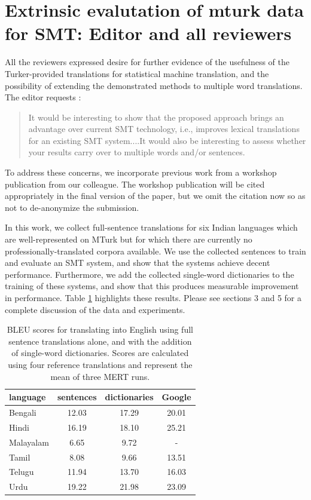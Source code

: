 \documentclass[11pt]{article}
\begin{document}
\section{Extrinsic evalutation of mturk data for SMT: Editor and all reviewers}

All the reviewers expressed desire for further evidence of the usefulness of the Turker-provided translations for statistical machine translation, and the possibility of extending the demonstrated methods to multiple word translations. The editor requests :

\begin{quote}
It would be interesting to show that the proposed approach brings an advantage over current SMT technology, i.e., improves lexical translations for an existing SMT system....It would also be interesting to assess whether your results carry over to multiple words and/or sentences. 
\end{quote}

To address these concerns, we incorporate previous work from a workshop publication from our colleague. The workshop publication will be cited appropriately in the final version of the paper, but we omit the citation now so as not to de-anonymize the submission. 

In this work, we collect full-sentence translations for six Indian languages which are well-represented on MTurk but for which there are currently no professionally-translated corpora available. We use the collected sentences to train and evaluate an SMT system, and show that the systems achieve decent performance. Furthermore, we add the collected single-word dictionaries to the training of these systems, and show that this produces measurable improvement in performance. Table \ref{dictionary_bleu} highlights these results. Please see sections 3 and 5 for a complete discussion of the data and experiments. 

\begin{table}[t]
\centering
\begin{tabular}{l|ccc}
  language  & sentences &  dictionaries & Google \\
  \hline\hline
  Bengali    &  12.03 & 17.29 & 20.01 \\
  Hindi      & 16.19 & 18.10 & 25.21\\  
  Malayalam    &  6.65 & 9.72 & - \\      
  Tamil      & 8.08 & 9.66 & 13.51\\  
  Telugu     & 11.94 & 13.70 & 16.03\\  
  Urdu        & 19.22 & 21.98 & 23.09\\   
\end{tabular}
\caption{BLEU scores for translating into English using full sentence translations alone, and with the addition of single-word dictionaries. Scores are calculated using four reference translations and represent the mean of three MERT runs.}
\label{dictionary_bleu}
\end{table}
\end{document}
